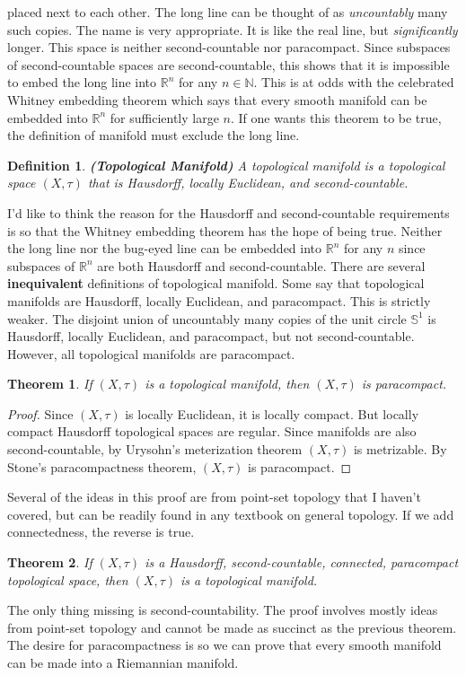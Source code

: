 \documentclass{article}
\theoremstyle{plain}
\newtheorem{theorem}{Theorem}[section]
\theoremstyle{normal}
\newtheorem{definition}{Definition}[section]
\begin{document}
        placed next to each other. The long line can be thought of as
        \textit{uncountably} many such copies. The name is very appropriate.
        It is like the real line, but \textit{significantly} longer. This space
        is neither second-countable nor paracompact. Since subspaces of
        second-countable spaces are second-countable, this shows that it is
        impossible to embed the long line into $\mathbb{R}^{n}$ for any
        $n\in\mathbb{N}$. This is at odds with the celebrated Whitney embedding
        theorem which says that every smooth manifold can be embedded into
        $\mathbb{R}^{n}$ for sufficiently large $n$. If one wants this theorem
        to be true, the definition of manifold must exclude the long line.
        \begin{definition}{\textbf{(Topological Manifold)}}
            A topological manifold is a topological space $(X,\tau)$ that is
            Hausdorff, locally Euclidean, and second-countable.
        \end{definition}
        I'd like to think the reason for the Hausdorff and second-countable
        requirements is so that the Whitney embedding theorem has the hope of
        being true. Neither the long line nor the bug-eyed line can be
        embedded into $\mathbb{R}^{n}$ for any $n$ since subspaces of
        $\mathbb{R}^{n}$ are both Hausdorff and second-countable. There are
        several \textbf{inequivalent} definitions of topological manifold. Some
        say that topological manifolds are Hausdorff, locally Euclidean, and
        paracompact. This is strictly weaker. The disjoint union of uncountably
        many copies of the unit circle $\mathbb{S}^{1}$ is Hausdorff, locally
        Euclidean, and paracompact, but not second-countable. However, all
        topological manifolds are paracompact.
        \begin{theorem}
            If $(X,\tau)$ is a topological manifold, then $(X,\tau)$ is
            paracompact.
        \end{theorem}
        \begin{proof}
            Since $(X,\tau)$ is locally Euclidean, it is locally compact.
            But locally compact Hausdorff topological spaces are regular.
            Since manifolds are also second-countable,
            by Urysohn's meterization theorem $(X,\tau)$ is metrizable.
            By Stone's paracompactness theorem, $(X,\tau)$ is paracompact.
        \end{proof}
        Several of the ideas in this proof are from point-set topology that I
        haven't covered, but can be readily found in any textbook on general
        topology. If we add connectedness, the reverse is true.
        \begin{theorem}
            If $(X,\tau)$ is a Hausdorff, second-countable, connected,
            paracompact topological space, then $(X,\tau)$ is a topological
            manifold.
        \end{theorem}
        The only thing missing is second-countability. The proof involves mostly
        ideas from point-set topology and cannot be made as succinct as the
        previous theorem. The desire for paracompactness is so we can prove
        that every smooth manifold can be made into a Riemannian manifold.
\end{document}
